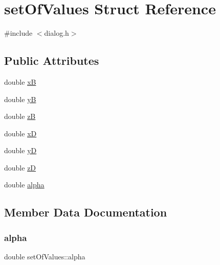 \hypertarget{structset_of_values}{}\section{set\+Of\+Values Struct Reference}
\label{structset_of_values}


{\ttfamily \#include $<$dialog.\+h$>$}

\subsection*{Public Attributes}
\begin{DoxyCompactItemize}
\item 
double \hyperlink{structset_of_values_af51a2722732fb80f626e6ab9c1f1fed3}{xB}
\item 
double \hyperlink{structset_of_values_a64756693023b45c80cbb542fd2f834e3}{yB}
\item 
double \hyperlink{structset_of_values_a00e8dca4650208fa2d9a7c8cce72bae2}{zB}
\item 
double \hyperlink{structset_of_values_ab937d8ca1493a6b7fcb4ec13a6507dd1}{xD}
\item 
double \hyperlink{structset_of_values_a229a82279aeb68d2b63c3ca81d12a4db}{yD}
\item 
double \hyperlink{structset_of_values_ae75c3668aeac869d48699ce68ab58375}{zD}
\item 
double \hyperlink{structset_of_values_a80a95f64eeeaf8e9fd70be85f6a47a77}{alpha}
\end{DoxyCompactItemize}


\subsection{Member Data Documentation}
\hypertarget{structset_of_values_a80a95f64eeeaf8e9fd70be85f6a47a77}{}\label{structset_of_values_a80a95f64eeeaf8e9fd70be85f6a47a77} 
\subsubsection{\texorpdfstring{alpha}{alpha}}
{\footnotesize\ttfamily double set\+Of\+Values\+::alpha}

\hypertarget{structset_of_values_af51a2722732fb80f626e6ab9c1f1fed3}{}\label{structset_of_values_af51a2722732fb80f626e6ab9c1f1fed3} 
